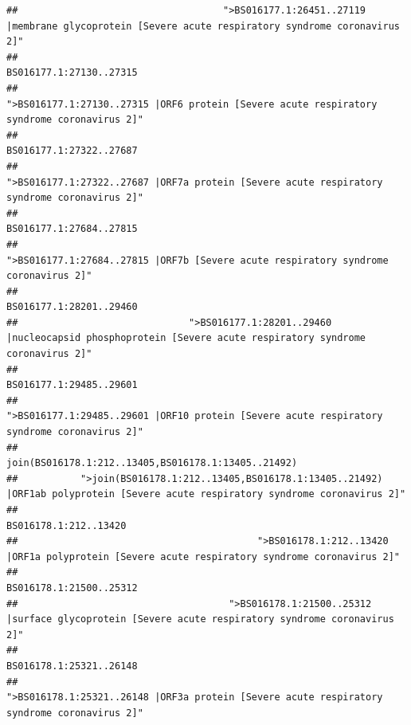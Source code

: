 \documentclass[
]{article}
\begin{document}
\begin{verbatim}
##                                    ">BS016177.1:26451..27119 |membrane glycoprotein [Severe acute respiratory syndrome coronavirus 2]" 
##                                                                                                                BS016177.1:27130..27315 
##                                             ">BS016177.1:27130..27315 |ORF6 protein [Severe acute respiratory syndrome coronavirus 2]" 
##                                                                                                                BS016177.1:27322..27687 
##                                            ">BS016177.1:27322..27687 |ORF7a protein [Severe acute respiratory syndrome coronavirus 2]" 
##                                                                                                                BS016177.1:27684..27815 
##                                                    ">BS016177.1:27684..27815 |ORF7b [Severe acute respiratory syndrome coronavirus 2]" 
##                                                                                                                BS016177.1:28201..29460 
##                              ">BS016177.1:28201..29460 |nucleocapsid phosphoprotein [Severe acute respiratory syndrome coronavirus 2]" 
##                                                                                                                BS016177.1:29485..29601 
##                                            ">BS016177.1:29485..29601 |ORF10 protein [Severe acute respiratory syndrome coronavirus 2]" 
##                                                                                    join(BS016178.1:212..13405,BS016178.1:13405..21492) 
##           ">join(BS016178.1:212..13405,BS016178.1:13405..21492) |ORF1ab polyprotein [Severe acute respiratory syndrome coronavirus 2]" 
##                                                                                                                  BS016178.1:212..13420 
##                                          ">BS016178.1:212..13420 |ORF1a polyprotein [Severe acute respiratory syndrome coronavirus 2]" 
##                                                                                                                BS016178.1:21500..25312 
##                                     ">BS016178.1:21500..25312 |surface glycoprotein [Severe acute respiratory syndrome coronavirus 2]" 
##                                                                                                                BS016178.1:25321..26148 
##                                            ">BS016178.1:25321..26148 |ORF3a protein [Severe acute respiratory syndrome coronavirus 2]" 

\end{verbatim}
\end{document}
